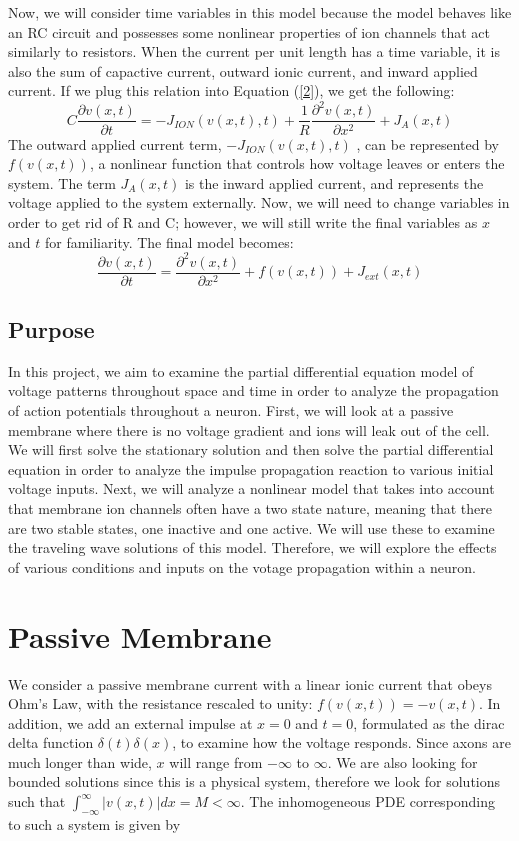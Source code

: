 \documentclass[12pt]{article}
\begin{document}
Now, we will consider time variables in this model because the model behaves like an RC circuit and possesses some nonlinear properties of ion channels that act similarly to resistors. When the current per unit length has a time variable, it is also the sum of capactive current, outward ionic current, and inward applied current. If we plug this relation into Equation (\ref{2}), we get the following:
\[C\frac{\partial{v(x,t)}}{\partial{t}}=-J_{ION}(v(x,t),t)+\frac{1}{R}\frac{\partial^2{v(x,t)}}{\partial{x}^2}+J_A(x,t)\]
The outward applied current term, $-J_{ION}(v(x,t),t)$ , can be represented by $f(v(x,t))$, a nonlinear function that controls how voltage leaves or enters the system. The term $J_A(x,t)$ is the inward applied current, and represents the voltage applied to the system externally. Now, we will need to change variables in order to get rid of R and C; however, we will still write the final variables as $x$ and $t$ for familiarity. The final model becomes:
\[\frac{\partial{v(x,t)}}{\partial{t}}=\frac{\partial^2{v(x,t)}}{\partial{x}^2}+f(v(x,t))+J_{ext}(x,t)\]

\subsection{Purpose}
In this project, we aim to examine the partial differential equation model of voltage patterns throughout space and time in order to analyze the propagation of action potentials throughout a neuron. First, we will look at a passive membrane where there is no voltage gradient and ions will leak out of the cell. We will first solve the stationary solution and then solve the partial differential equation in order to analyze the impulse propagation reaction to various initial voltage inputs. Next, we will analyze a nonlinear model that takes into account that membrane ion channels often have a two state nature, meaning that there are two stable states, one inactive and one active. We will use these to examine the traveling wave solutions of this model. Therefore, we will explore the effects of various conditions and inputs on the votage propagation within a neuron.
\section{Passive Membrane}
We consider a passive membrane current with a linear ionic current that obeys Ohm's Law, with the resistance rescaled to unity: $f(v(x,t)) = -v(x,t)$. In addition, we add an external impulse at $x=0$ and $t=0$, formulated as the dirac delta function $\delta(t) \delta(x)$, to examine how the voltage responds. Since axons are much longer than wide, $x$ will range from $-\infty$ to $\infty$. We are also looking for bounded solutions since this is a physical system, therefore we look for solutions such that $\int_{-\infty}^{\infty}|v(x,t)|dx = M < \infty$. The inhomogeneous PDE corresponding to such a system is given by
\end{document}
